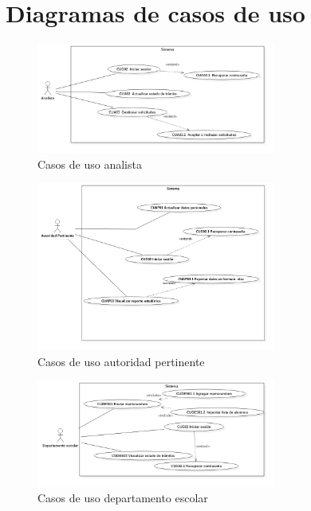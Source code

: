\section{Diagramas de casos de uso}

\begin{figure}[htbp!]
    \centering
        \includegraphics[width=0.7\textwidth]{images/img_casos/Analista.jpg}
    \caption{Casos de uso analista}
\end{figure}


\begin{figure}[htbp!]
    \centering
        \includegraphics[width=0.7\textwidth]{images/img_casos/AutoridadPertinente.jpg}
    \caption{Casos de uso autoridad pertinente}
\end{figure}

\begin{figure}[htbp!]
    \centering
        \includegraphics[width=0.7\textwidth]{images/img_casos/departamento_escolar.jpg}
    \caption{Casos de uso departamento escolar}
\end{figure}

